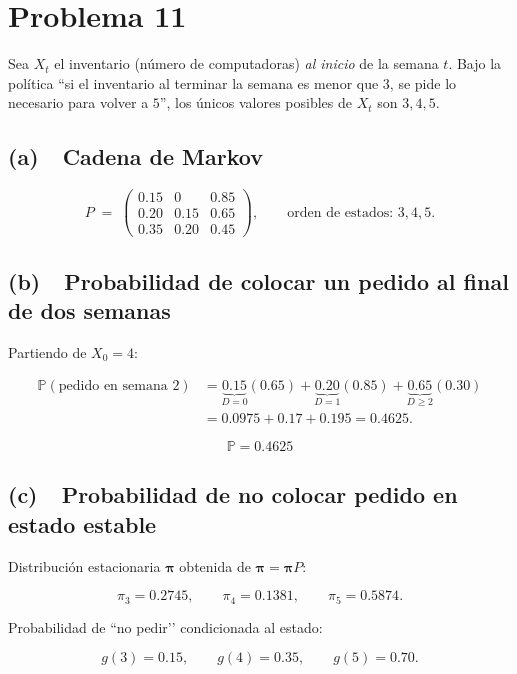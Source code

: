 \documentclass[12pt]{article}
\begin{document}
\section*{Problema 11}

Sea \(X_t\) el inventario (número de computadoras) \emph{al inicio} de la
semana \(t\).
Bajo la política ``si el inventario al terminar la
semana es menor que $3$, se pide lo necesario para volver a $5$'', los
únicos valores posibles de \(X_t\) son \(3,4,5\).

\subsection*{(a)  Cadena de Markov}

\[
P \;=\;
\begin{pmatrix}
0.15 & 0    & 0.85\\
0.20 & 0.15 & 0.65\\
0.35 & 0.20 & 0.45
\end{pmatrix},
\qquad
\text{orden de estados: } 3,4,5.
\]

\subsection*{(b)  Probabilidad de colocar un pedido al final de dos semanas}

Partiendo de \(X_0 = 4\):

\[
\begin{aligned}
\mathbb P(\text{pedido en semana }2)
&=\underbrace{0.15}_{D=0}\!(0.65)
  +\underbrace{0.20}_{D=1}\!(0.85)
  +\underbrace{0.65}_{D\ge 2}\!(0.30) \\[2mm]
&=0.0975 + 0.17 + 0.195 = 0.4625.
\end{aligned}
\]

\[
\boxed{\mathbb P=0.4625}
\]

\subsection*{(c)  Probabilidad de no colocar pedido en estado estable}

Distribución estacionaria \(\boldsymbol\pi\) obtenida de
\(\boldsymbol\pi = \boldsymbol\pi P\):

\[
\pi_3 = 0.2745,\qquad
\pi_4 = 0.1381,\qquad
\pi_5 = 0.5874.
\]

Probabilidad de ``no pedir’’ condicionada al estado:

\[
g(3)=0.15,\qquad g(4)=0.35,\qquad g(5)=0.70.
\]
\end{document}
